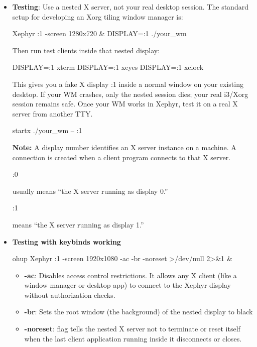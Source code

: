 \documentclass{report}
\begin{document}
    \pagebreak 
    \begin{itemize}
        \item \textbf{Testing}:  Use a nested X server, not your real desktop session. The standard setup for developing an Xorg tiling window manager is:
            \bigbreak \noindent 
            \begin{bashcode}
                Xephyr :1 -screen 1280x720 &
                DISPLAY=:1 ./your_wm
            \end{bashcode}
            \bigbreak \noindent 
            Then run test clients inside that nested display:
            \bigbreak \noindent 
            \begin{bashcode}
                DISPLAY=:1 xterm
                DISPLAY=:1 xeyes
                DISPLAY=:1 xclock
            \end{bashcode}
            \bigbreak \noindent 
            This gives you a fake X display :1 inside a normal window on your existing desktop. If your WM crashes, only the nested session dies; your real i3/Xorg session remains safe.
            \bigbreak \noindent 
            Once your WM works in Xephyr, test it on a real X server from another TTY.
            \bigbreak \noindent 
            \begin{cppcode}
                startx ./your_wm -- :1
            \end{cppcode}
            \bigbreak \noindent 
            \textbf{Note:} A display number identifies an X server instance on a machine. A connection is created when a client program connects to that X server.
            \bigbreak \noindent 
            \begin{cppcode}
            :0
            \end{cppcode}
            \bigbreak \noindent 
            usually means “the X server running as display 0.”
            \bigbreak \noindent 
            \begin{cppcode}
            :1
            \end{cppcode}
            \bigbreak \noindent 
            means “the X server running as display 1.”
        \item \textbf{Testing with keybinds working}
            \bigbreak \noindent 
            \begin{bashcode}
            ohup Xephyr :1 -screen 1920x1080 -ac -br -noreset >/dev/null 2>&1 &
            \end{bashcode}
            \bigbreak \noindent 
            \begin{itemize}
                \item \textbf{-ac}: Disables access control restrictions. It allows any X client (like a window manager or desktop app) to connect to the Xephyr display without authorization checks.
                \item \textbf{-br}: Sets the root window (the background) of the nested display to black
                \item \textbf{-noreset}: flag tells the nested X server not to terminate or reset itself when the last client application running inside it disconnects or closes.
            \end{itemize}



\end{itemize}
\end{document}
